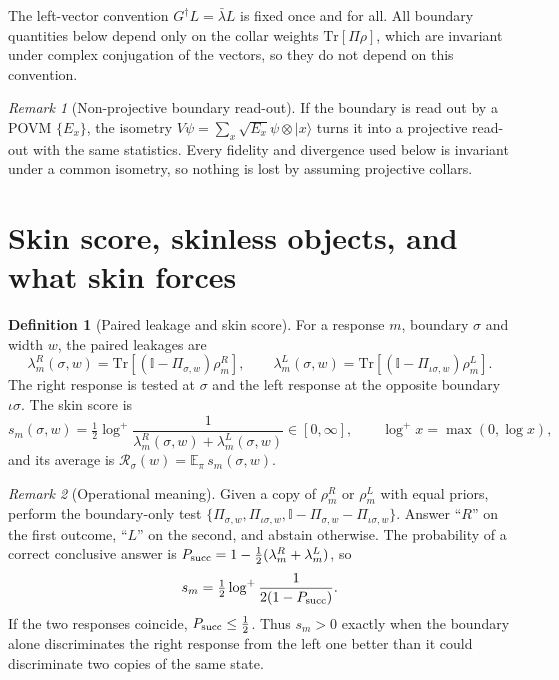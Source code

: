 \documentclass[11pt]{article}
\theoremstyle{definition}
\newtheorem{definition}{Definition}
\theoremstyle{remark}
\newtheorem{remark}{Remark}
\newcommand{\Tr}{\mathrm{Tr}}
\newcommand{\E}{\mathbb{E}}
\newcommand{\one}{\mathbb{I}}
\newcommand{\ket}[1]{|#1\rangle}
\newcommand{\isig}{\iota\sigma}
\begin{document}
The left-vector convention $G^\dagger L=\bar\lambda L$ is fixed once and for all. All boundary quantities below depend only on the collar weights $\Tr[\Pi\rho]$, which are invariant under complex conjugation of the vectors, so they do not depend on this convention.

\begin{remark}[Non-projective boundary read-out]
If the boundary is read out by a POVM $\{E_x\}$, the isometry $V\psi=\sum_x\sqrt{E_x}\psi\otimes\ket x$ turns it into a projective read-out with the same statistics. Every fidelity and divergence used below is invariant under a common isometry, so nothing is lost by assuming projective collars.
\end{remark}

\section{Skin score, skinless objects, and what skin forces}
\label{sec:score}

\begin{definition}[Paired leakage and skin score]\label{def:score}
For a response $m$, boundary $\sigma$ and width $w$, the paired leakages are
\[
\lambda^R_m(\sigma,w)=\Tr[(\one-\Pi_{\sigma,w})\rho^R_m],\qquad
\lambda^L_m(\sigma,w)=\Tr[(\one-\Pi_{\isig,w})\rho^L_m].
\]
The right response is tested at $\sigma$ and the left response at the opposite boundary $\isig$. The skin score is
\[
s_m(\sigma,w)=\tfrac12\log^+\frac{1}{\lambda^R_m(\sigma,w)+\lambda^L_m(\sigma,w)}\in[0,\infty],\qquad \log^+x=\max(0,\log x),
\]
and its average is $\mathcal R_\sigma(w)=\E_\pi\, s_m(\sigma,w)$.
\end{definition}

\begin{remark}[Operational meaning]\label{rem:operational}
Given a copy of $\rho^R_m$ or $\rho^L_m$ with equal priors, perform the boundary-only test $\{\Pi_{\sigma,w},\Pi_{\isig,w},\one-\Pi_{\sigma,w}-\Pi_{\isig,w}\}$. Answer ``$R$'' on the first outcome, ``$L$'' on the second, and abstain otherwise. The probability of a correct conclusive answer is $P_{\rm succ}=1-\frac12(\lambda^R_m+\lambda^L_m)$, so
\[
s_m=\tfrac12\log^+\frac{1}{2(1-P_{\rm succ})}.
\]
If the two responses coincide, $P_{\rm succ}\le\frac12$. Thus $s_m>0$ exactly when the boundary alone discriminates the right response from the left one better than it could discriminate two copies of the same state.
\end{remark}
\end{document}
